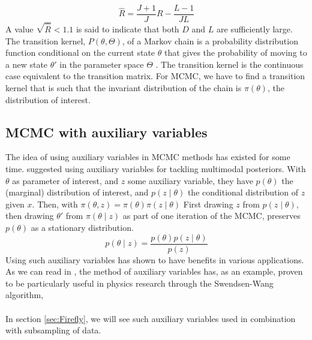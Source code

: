 \begin{equation}\label{eq:Gelman-Rubin_adjusted}
    \hat{R} = \frac{J+1}{J}R - \frac{L-1}{JL} 
\end{equation}
A value $\sqrt{\hat{R}}<1.1$ is said to indicate that both $D$ and $L$ are sufficiently large.
The transition kernel, $P\left(\theta, \Theta\right)$, of a Markov chain is a probability distribution function conditional on the current state $\theta$ that gives the probability of moving to a new state $\theta'$ in the parameter space $\Theta$ \cite{chib1995understanding}. The transition kernel is the continuous case equivalent to the transition matrix.  For MCMC, we have to find a transition kernel that is such that the invariant distribution of the chain is $\pi\left(\theta\right)$, the distribution of interest. 

\subsection{MCMC with auxiliary variables}
The idea of using auxiliary variables in MCMC methods has existed for some time. 
\cite{Besag} suggested using auxiliary variables for tackling multimodal posteriors.
With $\theta$ as parameter of interest, and $z$ some auxiliary variable, they have $p\left(\theta\right)$ the (marginal) distribution of interest, and $p\left(z\mid\theta\right)$ the conditional distribution of $z$ given $x$. 
Then, with $\pi\left(\theta, z\right) = \pi\left(\theta\right)\pi\left(z\mid\theta\right)$ 
First drawing $z$ from $p\left(z\mid \theta\right)$, then drawing $\theta'$ from $\pi\left(\theta\mid z\right)$ as part of one iteration of the MCMC, preserves $p\left(\theta\right)$ as a stationary distribution. 
$$p\left(\theta\mid z\right) = \frac{p\left(\theta\right) p\left(z\mid\theta\right)}{p\left(z\right)}$$
Using such auxiliary variables has shown to have benefits in various applications. 
As we can read in \cite{Besag}, the method of auxiliary variables has, as an example, proven to be particularly useful in physics research through the Swendsen-Wang algorithm, 
\\ \\ In section \ref{sec:Firefly}, we will see such auxiliary variables used in combination with subsampling of data.
